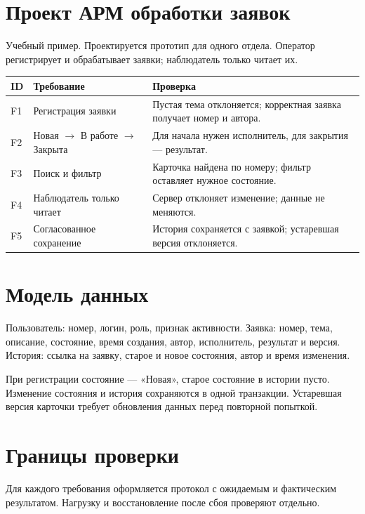 \documentclass[a4paper,14pt]{extarticle}
\begin{document}
\section*{Проект АРМ обработки заявок}
Учебный пример. Проектируется прототип для одного отдела.
Оператор регистрирует и обрабатывает заявки; наблюдатель только читает их.
\par\vspace{6pt}

\noindent
\begin{tabularx}{\linewidth}{|l|>{\raggedright\arraybackslash}X|>{\raggedright\arraybackslash}X|}
\hline
ID & Требование & Проверка \\
\hline
F1 & Регистрация заявки & Пустая тема отклоняется; корректная заявка получает номер и автора. \\
\hline
F2 & Новая $\to$ В работе $\to$ Закрыта & Для начала нужен исполнитель, для закрытия --- результат. \\
\hline
F3 & Поиск и фильтр & Карточка найдена по номеру; фильтр оставляет нужное состояние. \\
\hline
F4 & Наблюдатель только читает & Сервер отклоняет изменение; данные не меняются. \\
\hline
F5 & Согласованное сохранение & История сохраняется с заявкой; устаревшая версия отклоняется. \\
\hline
\end{tabularx}

\section*{Модель данных}
Пользователь: номер, логин, роль, признак активности.
Заявка: номер, тема, описание, состояние, время создания, автор,
исполнитель, результат и версия. История: ссылка на заявку,
старое и новое состояния, автор и время изменения.

При регистрации состояние --- «Новая», старое состояние в истории пусто.
Изменение состояния и история сохраняются в одной транзакции.
Устаревшая версия карточки требует обновления данных перед повторной попыткой.

\section*{Границы проверки}
Для каждого требования оформляется протокол с ожидаемым и фактическим результатом.
Нагрузку и восстановление после сбоя проверяют отдельно.
\end{document}
